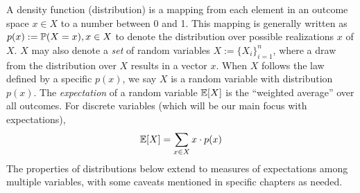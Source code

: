 
A density function (distribution) is a mapping from each element in an outcome space $x \in X$ to a number between 0 and 1.
This mapping is generally written as $p(x):=\mathbb{P}(X=x), x \in X$ to denote the distribution over possible realizations $x$ of $X$.
$X$ may also denote a \textit{set} of random variables $X:=\{X_i\}_{i=1}^n$, where a draw from the distribution over $X$ results in a vector $x$. When $X$ follows the law defined by a specific $p(x)$, we say $X$ is a random variable with distribution $p(x)$.
The \textit{expectation} of a random variable $\mathbb{E}[X]$ is the ``weighted average'' over all outcomes. For discrete variables (which will be our main focus with expectations), 
\begin{align}
\mathbb{E}[X] = \sum_{x\in X} x\cdot p(x)
\end{align}
The properties of distributions below extend to measures of expectations among multiple variables, with some caveats mentioned in specific chapters as needed.

